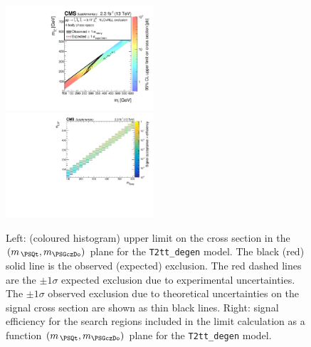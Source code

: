 \begin{figure}[t]
  \begin{center}
    \includegraphics[width=0.49\textwidth]{RA1T2-4bdXSEC_aux} \, 
    \includegraphics[width=0.49\textwidth]{T2-4bd_merging_4_cats_aux} \,     
  \end{center}
  \caption{Left: (coloured histogram) upper limit on the cross section in the $(m_{\,\PSQt}, m_{\PSGczDo})$ plane for the \texttt{T2tt\_degen} model. 
  The black (red) solid line is the observed (expected) exclusion. The red dashed lines are the $\pm1\sigma$ expected exclusion due to experimental uncertainties. 
  The $\pm1\sigma$ observed exclusion due to theoretical uncertainties on the signal cross section are shown as thin black lines. 
  Right: signal efficiency for the search regions included in the limit calculation as a function $(m_{\,\PSQt}, m_{\PSGczDo})$ plane for the \texttt{T2tt\_degen} model. 
  \label{fig:T2-4bd_excl}}
\end{figure}


